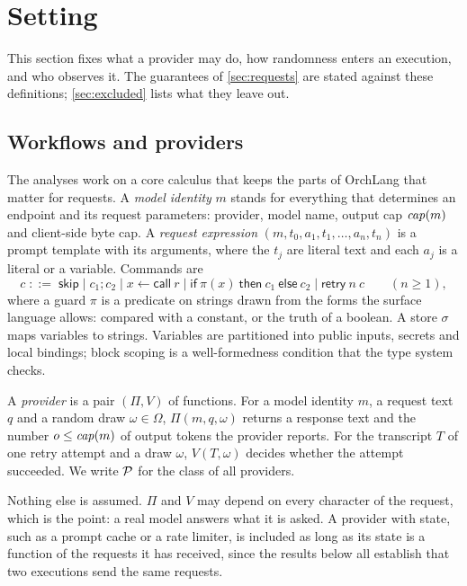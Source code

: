 \section{Setting}\label{sec:setting}

This section fixes what a provider may do, how randomness enters an execution, and
who observes it. The guarantees of \cref{sec:requests} are stated against these
definitions; \cref{sec:excluded} lists what they leave out.

\subsection{Workflows and providers}\label{sec:providers}

The analyses work on a core calculus that keeps the parts of OrchLang that matter
for requests. A \emph{model identity} $m$ stands for everything that determines an
endpoint and its request parameters: provider, model name, output cap $\mathit{cap}(m)$
and client-side byte cap. A \emph{request expression} $(m, t_0, a_1, t_1, \dots,
a_n, t_n)$ is a prompt template with its arguments, where the $t_j$ are literal text
and each $a_j$ is a literal or a variable. Commands are
\[
c \;::=\; \mathsf{skip} \mid c_1;c_2 \mid x \leftarrow \mathsf{call}\ r \mid
\mathsf{if}\ \pi(x)\ \mathsf{then}\ c_1\ \mathsf{else}\ c_2 \mid \mathsf{retry}\ n\ c
\qquad (n \geq 1),
\]
where a guard $\pi$ is a predicate on strings drawn from the forms the surface
language allows:  compared with a constant, or the truth of a
boolean. A store $\sigma$ maps variables to strings. Variables are partitioned into
public inputs, secrets and local bindings; block scoping is a well-formedness
condition that the type system checks.

\begin{definition}[Provider]\label{def:provider}
A \emph{provider} is a pair $(\Pi, V)$ of functions. For a model identity $m$, a
request text $q$ and a random draw $\omega \in \Omega$, $\Pi(m, q, \omega)$ returns a
response text and the number $o \leq \mathit{cap}(m)$ of output tokens the provider
reports. For the transcript $T$ of one retry attempt and a draw $\omega$,
$V(T, \omega)$ decides whether the attempt succeeded. We write $\mathcal{P}$ for the class
of all providers.
\end{definition}

Nothing else is assumed. $\Pi$ and $V$ may depend on every character of the
request, which is the point: a real model answers what it is asked. A provider
with state, such as a prompt cache or a rate limiter, is included as long as its
state is a function of the requests it has received, since the results below all
establish that two executions send the same requests.

